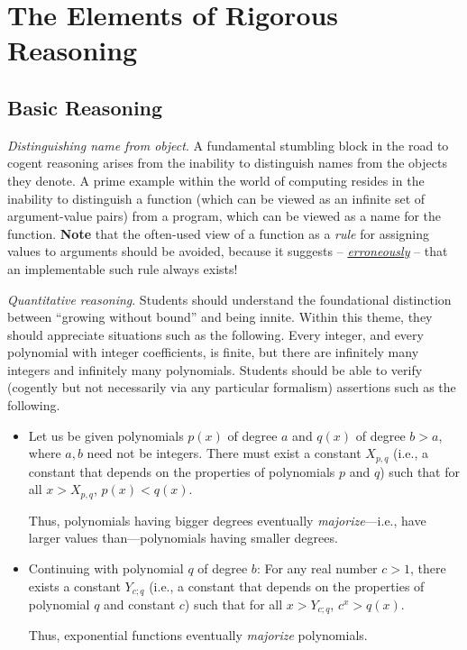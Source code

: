 \section{The Elements of Rigorous Reasoning}


\subsection{Basic Reasoning}

{\em Distinguishing name from object}.
%
A fundamental stumbling block in the road to cogent reasoning arises
from the inability to distinguish names from the objects they denote.
A prime example within the world of computing resides in the inability
to distinguish a function (which can be viewed as an infinite set of
argument-value pairs) from a program, which can be viewed as a name
for the function.  {\bf Note} that the often-used view of a function
as a {\em rule} for assigning values to arguments should be avoided,
because it suggests -- \underline{\em erroneously} -- that an
implementable such rule always exists!

{\em Quantitative reasoning}.
%
Students should understand the foundational distinction between
``growing without bound'' and being innite.  Within this theme, they
should appreciate situations such as the following.  Every integer,
and every polynomial with integer coefficients, is finite, but there
are infinitely many integers and infinitely many polynomials.
Students should be able to verify (cogently but not necessarily via
any particular formalism) assertions such as the following.
\begin{itemize}
\item
Let us be given polynomials $p(x)$ of degree $a$ and $q(x)$ of degree
$b > a$, where $a, b$ need not be integers.  There must exist a
constant $X_{p,q}$ (i.e., a constant that depends on the properties of
polynomials $p$ and $q$) such that for all $x > X_{p,q}$, $p(x) <
q(x)$.

Thus, polynomials having bigger degrees eventually {\em
  majorize}---i.e., have larger values than---polynomials having
smaller degrees.

\item
Continuing with polynomial $q$ of degree $b$: For any real number $c >
1$, there exists a constant $Y_{c;q}$ (i.e., a constant that depends
on the properties of polynomial $q$ and constant $c$) such that for
all $x > Y_{c;q}$, $c^x > q(x)$.

Thus, exponential functions eventually {\em majorize} polynomials.
\end{itemize}

